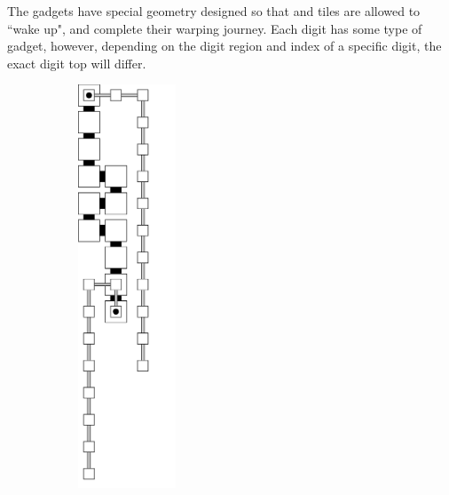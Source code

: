 \subsubsection{\dtop}

The {\dtop} gadgets have special geometry designed so that {\firstwarp} and
{\secondwarp} tiles are allowed to ``wake up", and complete their warping journey. Each
digit has some type of {\dtop} gadget, however, depending on the digit region
and index of a specific digit, the exact digit top will differ.


\vspace{.5cm}


\begin{figure}[H]
    \centering
    \begin{subfigure}[t]{0.32\textwidth}
        \centering
        \includegraphics[width=0.32\textwidth]{digit_top_general_topper}

\end{subfigure}
\end{figure}
